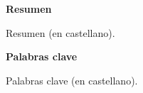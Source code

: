 
\cleardoublepage

\thispagestyle{empty}

\begin{center}

{\bf \Huge Resumen}

  \end{center}
\vspace{1cm}

Resumen (en castellano).


\begin{center}

{\bf \Large Palabras clave}

   \end{center}

   \vspace{0.5cm}
   
  Palabras clave (en castellano). 



